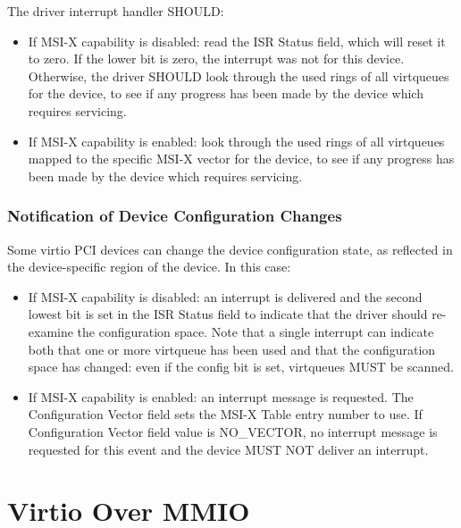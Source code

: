 The driver interrupt handler SHOULD:

\begin{itemize}
  \item If MSI-X capability is disabled: read the ISR Status field,
  which will reset it to zero. If the lower bit is zero, the
  interrupt was not for this device. Otherwise, the driver
  SHOULD look through the used rings of all virtqueues for the
  device, to see if any progress has been made by the device
  which requires servicing.

  \item If MSI-X capability is enabled: look through the used rings of
  all virtqueues mapped to the specific MSI-X vector for the
  device, to see if any progress has been made by the device
  which requires servicing.
\end{itemize}

\subsubsection{Notification of Device Configuration Changes}\label{sec:Virtio Transport Options / Virtio Over PCI Bus / PCI-specific Initialization And Device Operation / Notification of Device Configuration Changes}

Some virtio PCI devices can change the device configuration
state, as reflected in the device-specific region of the device. In this case:

\begin{itemize}
  \item If MSI-X capability is disabled: an interrupt is delivered and
  the second lowest bit is set in the ISR Status field to
  indicate that the driver should re-examine the configuration
  space.  Note that a single interrupt can indicate both that one
  or more virtqueue has been used and that the configuration
  space has changed: even if the config bit is set, virtqueues
  MUST be scanned.

  \item If MSI-X capability is enabled: an interrupt message is
  requested. The Configuration Vector field sets the MSI-X Table
  entry number to use. If Configuration Vector field value is
  NO_VECTOR, no interrupt message is requested for this event and
  the device MUST NOT deliver an interrupt.
\end{itemize}

\section{Virtio Over MMIO}\label{sec:Virtio Transport Options / Virtio Over MMIO}

